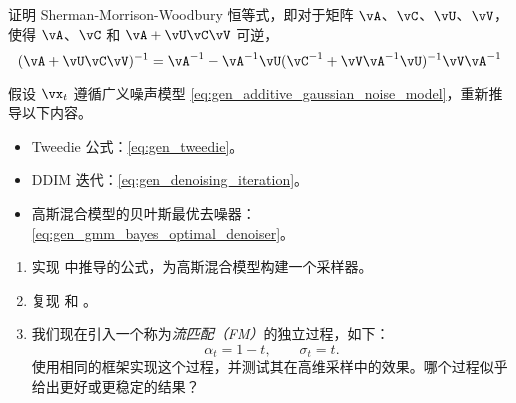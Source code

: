 \documentclass[../../book-main_zh.tex]{subfiles}
\begin{document}
\begin{exercise}\label{exercise:sherman_morrison_woodbury_identity}
    证明 Sherman-Morrison-Woodbury 恒等式，即对于矩阵 \(\vA\)、\(\vC\)、\(\vU\)、\(\vV\)，使得 \(\vA\)、\(\vC\) 和 \(\vA + \vU\vC\vV\) 可逆，
    \begin{equation}
        (\vA + \vU\vC\vV)^{-1} = \vA^{-1} - \vA^{-1}\vU(\vC^{-1} + \vV\vA^{-1}\vU)^{-1}\vV\vA^{-1}
    \end{equation}
\end{exercise}

\begin{exercise}\label{exercise:generalizing_results_to_different_noise_models}
    假设 \(\vx_{t}\) 遵循广义噪声模型 \eqref{eq:gen_additive_gaussian_noise_model}，重新推导以下内容。
    \begin{itemize}
        \item Tweedie 公式：\eqref{eq:gen_tweedie}。
        \item DDIM 迭代：\eqref{eq:gen_denoising_iteration}。
        \item 高斯混合模型的贝叶斯最优去噪器：\eqref{eq:gen_gmm_bayes_optimal_denoiser}。
    \end{itemize}
\end{exercise}

\begin{exercise}\label{exercise:implement_denoising_processes}
\begin{enumerate}
    \item 实现  中推导的公式，为高斯混合模型构建一个采样器。
    \item 复现  和 。
    \item 我们现在引入一个称为\textit{流匹配（FM）}的独立过程，如下：
    \begin{equation}
        \alpha_{t} = 1 - t, \qquad \sigma_{t} = t.
    \end{equation}
    使用相同的框架实现这个过程，并测试其在高维采样中的效果。哪个过程似乎给出更好或更稳定的结果？
\end{enumerate}
\end{exercise}
\end{document}
